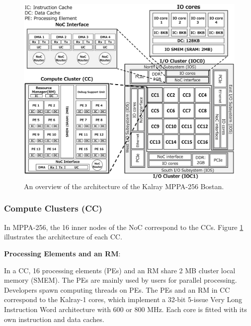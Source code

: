 \documentclass[conference,compsoc]{IEEEtran}
\newcommand{\comment}[1]{}
\begin{document}
\begin{figure}[t]
  \centering
  \includegraphics[width=1.0\linewidth]{../figure/mppa_architecture.eps}
  \vspace{-7mm}
  \caption{\label{fig:mppa_architecture}
    An overview of the architecture of the Kalray MPPA-256 Bostan.}
  \vspace{-5mm}
\end{figure}

\vspace{-3mm}
\subsubsection{Compute Clusters (CC)}
\label{sec:cc}
In MPPA-256, the 16 inner nodes of the NoC correspond to the CCs.
Figure \ref{fig:mppa_architecture} illustrates the architecture of each CC.

\textbf{Processing Elements and an RM}:
\comment{2-3}
In a CC, 16 processing elements (PEs) and an RM share 2 MB cluster local memory (SMEM).
The PEs are mainly used by users for parallel processing.
Developers spawn computing threads on PEs.
The PEs and an RM in CC correspond to the Kalray-1 cores, which implement a 32-bit 5-issue Very Long Instruction Word architecture with 600 or 800 MHz.
Each core is fitted with its own instruction and data caches.
\end{document}
